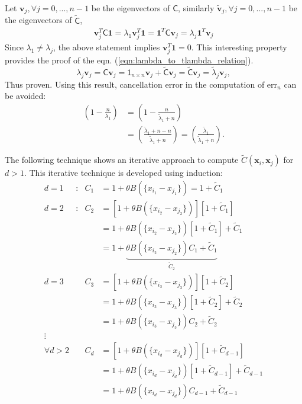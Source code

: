 \documentclass[twocolumn]{svjour3}          %
\newcommand{\bm}[1]{\boldsymbol{#1}}
\newcommand{\vv}{\bm{v}}
\newcommand{\vx}{\bm{x}}
\newcommand{\tvv}{\tilde{\vv}}
\newcommand{\vone}{\bm{1}}
\newcommand{\mC}{\mathsf{C}}
\newcommand{\tmC}{\widetilde{\mathsf{C}}}
\newcommand{\tlambda}{\tilde{\lambda}}
\newcommand{\errn}{\text{err}_{n}}
\begin{document}
Let $\vv_j, \forall j=0,...,n-1$ be the eigenvectors of $\mC$, similarly
 $\tvv_j, \forall j=0,...,n-1$ be the eigenvectors of $\tmC$,
\begin{align*}
\vv_j^T \mC \vone = \lambda_1 \vv_j^T \vone
 = \vone^T \mC \vv_j
 = \lambda_j \vone^T  \vv_j
 \end{align*}
Since $\lambda_1 \neq \lambda_j$, the above statement implies $\vv_j^T \vone = 0$. This interesting property provides the proof of the eqn. (\ref{eqn:lambda_to_tlambda_relation}).
\[
\lambda_j \vv_j = \mC \vv_j = \mathsf{1}_{n \times n} \vv_j + \tmC \vv_j 
= \tmC \vv_j = \tlambda_j \vv_j ,
\]
Thus proven. 
Using this result, 
cancellation error in the computation of $\errn$ can be avoided:
\begin{align*}
\left( 1 - \frac{n }{\lambda_1} \right) 
& = \left( 1 - \frac{n }{\tlambda_1 + n} \right)
\\
& = \left( \frac{\tlambda_1 + n - n }{\tlambda_1 + n} \right)
 = \left( \frac{\tlambda_1 }{\tlambda_1 + n} \right).
\end{align*}


The following technique shows an iterative approach to compute $\tilde{C}(\vx_i,\vx_j)$ for $d > 1$. This iterative technique is developed using induction:
\begin{align*}
d=1 &:& C_1 &= 1 + \theta B(\{x_{i_1} - x_{j_1}\}) = 1 + \tilde{C}_1
\\
d=2 &:& C_2 &= [1 + \theta B(\{x_{i_2} - x_{j_2}\})] [1 + \tilde{C}_1]
\\
    &&      &= 1 +  \theta B(\{x_{i_2} - x_{j_2}\}) [1 + \tilde{C}_1]  +  \tilde{C}_1 
\\
    &&      &= 1 +  \underbrace{\theta B(\{x_{i_2} - x_{j_2}\}) C_1  +  \tilde{C}_1 }_{\tilde{C}_2}
\\
d=3 &&  C_3 &= [1 +  \theta B(\{x_{i_3} - x_{j_3}\})][ 1 + \tilde{C}_2] 
\\
    &&      &= 1 +  \theta B(\{x_{i_3} - x_{j_3}\})[1 + \tilde{C}_2] + \tilde{C}_2
\\
    &&      &= 1 +  \theta B(\{x_{i_3} - x_{j_3}\})C_2 + \tilde{C}_2
\\
\vdots
\\
\forall d>2 && C_d &= [1 +  \theta B(\{x_{i_d} - x_{j_d}\})][ 1 + \tilde{C}_{d-1}] 
\\
&& &= 1 +  \theta B(\{x_{i_d} - x_{j_d}\})[ 1 + \tilde{C}_{d-1}] + \tilde{C}_{d-1}
\\
&& &= 1 +  \theta B(\{x_{i_d} - x_{j_d}\})C_{d-1} + \tilde{C}_{d-1}
\end{align*}
\end{document}
